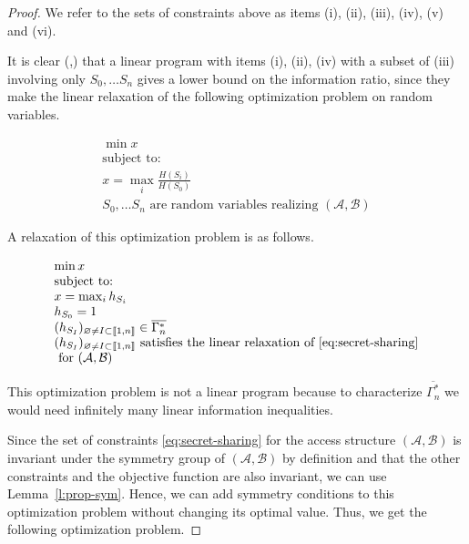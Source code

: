 \documentclass[11pt, a4paper]{kybernetika}
\begin{document}
	\begin{proof}
		We refer to the sets of constraints above as items (i), (ii), (iii), (iv), (v) and (vi). 
		
		It is clear (\cite{farras2018improving},\cite{gurpinar2019use}) that a linear program with items (i), (ii), (iv) with a subset of (iii) involving only $S_0,\ldots S_n$ gives a lower bound on the information ratio, since they make the linear relaxation of the following optimization problem on random variables.
		
		$$
		\begin{array}{l}
			\min x\\
			\text{subject to:}\\
			x=\max_i\frac{H(S_i)}{H(S_0)}\\
			S_0,\ldots S_n\text{ are random variables realizing }(\mathcal{A},\mathcal{B}) 
		\end{array}
		$$
		
		A relaxation of this optimization problem is as follows.
		
		$$
		\begin{array}{l}
			\min x\\
			\text{subject to:}\\
			x=\max_ih_{S_i}\\
			h_{S_0}=1\\
			(h_{S_I})_{\varnothing\neq I\subset\llbracket1,n\rrbracket}\in\overline{\Gamma_n^*}\\
			(h_{S_I})_{\varnothing\neq I\subset\llbracket1,n\rrbracket}\text{ satisfies the linear relaxation of }\ref{eq:secret-sharing}\\
			\text{ for }(\mathcal{A},\mathcal{B})
		\end{array}
		$$
		
		This optimization problem is not a linear program because to characterize $\overline{\Gamma_n^*}$ we would need infinitely many linear information inequalities.
		
		Since the set of constraints \ref{eq:secret-sharing} for the access structure $(\mathcal{A},\mathcal{B})$ is invariant under the symmetry group of $(\mathcal{A},\mathcal{B})$ by definition and that the other constraints and the objective function are also invariant, we can use Lemma~\ref{l:prop-sym}. Hence, we can add symmetry conditions to this optimization problem without changing its optimal value. Thus, we get the following optimization problem.
		

\end{proof}
\end{document}
